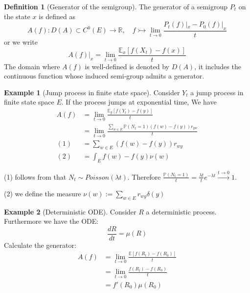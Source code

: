 \documentclass[a4paper,11pt]{book}
\theoremstyle{definition}
\newtheorem{definition}{Definition}[section]
\newtheorem*{example}{Example}
\theoremstyle{remark}
\begin{document}
\begin{definition}[Generator of the semigroup]
The generator of a semigroup $P_t$ on the state $x$ is defined as
\begin{equation*}
	A(f): D(A) \subset C^0(E) \rightarrow \mathbb{R},\quad f \rightarrowtail \lim_{t \rightarrow 0} \frac{P_t(f)|_x - P_0(f)|_x}{t}
\end{equation*}
or we write
\begin{equation*}
	A(f)|_x = \lim_{t \rightarrow 0} \frac{\mathbb{E}_x[f(X_t) - f(x)]}{t}
\end{equation*}
The domain where $A(f)$ is well-defined is denoted by $D(A)$, it includes the continuous function whose induced semi-group admits a generator.
\end{definition}

\begin{example}[Jump process in finite state space]
Consider $Y_t$ a jump process in finite state space $E$. If the process jumps at exponential time, We have
\begin{align*}
	A(f) &= \lim_{t \rightarrow 0} \frac{\mathbb{E}_y[f(Y_t) - f(y)]}{t}\\
	&= \lim_{t \rightarrow 0} \frac{\sum_{w \in E} \mathbb{P}(N_t = 1)(f(w) - f(y)) r_{yw} }{t}\\
	(1)&= \sum_{w \in E}(f(w) - f(y))r_{wy} \\
	(2)&= \int_E f(w) - f(y) \nu(w)
\end{align*}

(1) follows from that $N_t \sim Poisson(\lambda t)$. Therefore $\frac{\mathbb{P}(N_t = 1)}{t} = \frac{\lambda t }{t} e^{-\lambda t} \overset{ t \rightarrow 0}{\rightarrow}  1 $.\par
(2) we define the measure $\nu(w):= \sum_{w \in E} r_{wy} \delta(y)$
\end{example}

\begin{example}[Deterministic ODE]
Consider $R$ a deterministic process. Furthermore we have the ODE:
\begin{equation*}
	\frac{dR}{dt} = \mu(R)
\end{equation*}
Calculate the generator:
\begin{align*}
	A(f) &= \lim_{t \rightarrow 0} \frac{\mathbb{E}[f(R_t) - f(R_0)]}{t}\\
	&= \lim_{t \rightarrow 0} \frac{f(R_t) - f(R_0)}{t}\\
	&= f'(R_0) \mu(R_0)
\end{align*}
\end{example}
\end{document}
